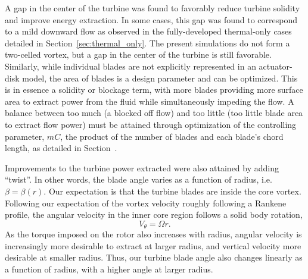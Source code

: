 A gap in the center of the turbine was found to favorably reduce turbine
solidity and improve energy extraction. In some cases, this gap was
found to correspond to a mild downward flow as observed in the
fully-developed thermal-only cases detailed in
Section~\ref{sec:thermal_only}. The present simulations do not form a
two-celled vortex, but a gap in the center of the turbine is still
favorable. Similarly, while individual blades are not explicitly
represented in an actuator-disk model, the area of blades is a design
parameter and can be optimized. This is in essence a solidity or
blockage term, with more blades providing more surface area to extract
power from the fluid while simultaneously impeding the flow. A balance
between too much (a blocked off flow) and too little (too little blade
area to extract flow power) must be attained through optimization of the
controlling parameter, $mC$, the product of the number of blades and
each blade's chord length, as detailed in
Section~\label{sec:actuator_disk}. 

Improvements to the turbine power extracted were also attained by adding
``twist''. In other words, the blade angle varies as a function of
radius, i.e. $\beta = \beta(r)$. Our expectation is that the turbine
blades are inside the core vortex. Following our expectation of the
vortex velocity roughly following a Rankene profile, the angular
velocity in the inner core region follows a solid body rotation, 
\begin{equation}
 V_{\theta} = \Omega r . 
\end{equation}
As the torque imposed on the rotor also increases with radius, angular
velocity is increasingly more desirable to extract at larger radius, and
vertical velocity more desirable at smaller radius. Thus, our turbine
blade angle also changes linearly as a function of radius, with
a higher angle at larger radius. 

